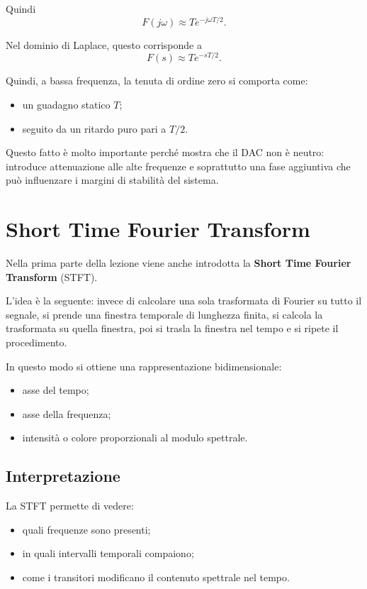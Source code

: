 Quindi
\[
F(j\omega)\approx T e^{-j\omega T/2}.
\]

Nel dominio di Laplace, questo corrisponde a
\[
F(s)\approx T e^{-sT/2}.
\]

Quindi, a bassa frequenza, la tenuta di ordine zero si comporta come:
\begin{itemize}
    \item un guadagno statico \(T\);
    \item seguito da un ritardo puro pari a \(T/2\).
\end{itemize}

Questo fatto è molto importante perché mostra che il DAC non è neutro:
introduce attenuazione alle alte frequenze e soprattutto una fase aggiuntiva
che può influenzare i margini di stabilità del sistema.

\section{Short Time Fourier Transform}

Nella prima parte della lezione viene anche introdotta la \textbf{Short Time Fourier Transform} (STFT).

L'idea è la seguente:
invece di calcolare una sola trasformata di Fourier su tutto il segnale,
si prende una finestra temporale di lunghezza finita, si calcola la trasformata
su quella finestra, poi si trasla la finestra nel tempo e si ripete il procedimento.

In questo modo si ottiene una rappresentazione bidimensionale:
\begin{itemize}
    \item asse del tempo;
    \item asse della frequenza;
    \item intensità o colore proporzionali al modulo spettrale.
\end{itemize}

\subsection{Interpretazione}

La STFT permette di vedere:
\begin{itemize}
    \item quali frequenze sono presenti;
    \item in quali intervalli temporali compaiono;
    \item come i transitori modificano il contenuto spettrale nel tempo.
\end{itemize}

